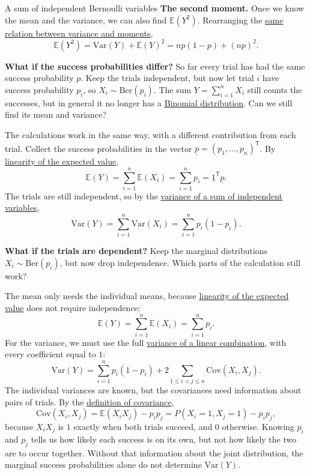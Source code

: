 \documentclass[a4paper,12pt,oneside]{report}
\begin{document}
\begin{framedexample}{A sum of independent Bernoulli variables}
\textbf{The second moment.} Once we know the mean and the variance, we
can also find $\mathbb{E}(Y^2)$. Rearranging the
\hyperref[prop:var-moments]{same relation between variance and moments},
\[
\mathbb{E}(Y^2)=\mathrm{Var}(Y)+\mathbb{E}(Y)^2
=np(1-p)+(np)^2.
\]

\textbf{What if the success probabilities differ?} So far every trial
has had the same success probability $p$. Keep the trials independent,
but now let trial $i$ have success probability $p_i$, so
$X_i\sim\mathrm{Ber}(p_i)$. The sum $Y=\sum_{i=1}^nX_i$ still counts
the successes, but in general it no longer has a
\hyperref[sec:binomial]{Binomial distribution}. Can we still find its
mean and variance?

The calculations work in the same way, with a different contribution
from each trial. Collect the success probabilities in the vector
$\underline{p}=(p_1,\ldots,p_n)^{\mathsf T}$. By
\hyperref[prop:linear-vector]{linearity of the expected value},
\[
\mathbb{E}(Y)=\sum_{i=1}^n\mathbb{E}(X_i)
=\sum_{i=1}^n p_i=\underline{1}^{\mathsf T}\underline{p}.
\]
The trials are still independent, so by
the \hyperref[cor:var-independent]{variance of a sum of independent variables},
\[
\mathrm{Var}(Y)=\sum_{i=1}^n\mathrm{Var}(X_i)
=\sum_{i=1}^n p_i(1-p_i).
\]

\textbf{What if the trials are dependent?} Keep the marginal
distributions $X_i\sim\mathrm{Ber}(p_i)$, but now drop independence.
Which parts of the calculation still work?

The mean only needs the individual means, because
\hyperref[prop:linear-vector]{linearity of the expected value} does not
require independence:
\[
\mathbb{E}(Y)=\sum_{i=1}^n\mathbb{E}(X_i)
=\sum_{i=1}^n p_i.
\]
For the variance, we must use the full
\hyperref[prop:var-linear]{variance of a linear combination}, with
every coefficient equal to $1$:
\[
\mathrm{Var}(Y)=\sum_{i=1}^n p_i(1-p_i)
+2\sum_{1\le i<j\le n}\mathrm{Cov}(X_i,X_j).
\]
The individual variances are known, but the covariances need information
about pairs of trials. By the
\hyperref[def:covariance]{definition of covariance},
\[
\mathrm{Cov}(X_i,X_j)=\mathbb{E}(X_iX_j)-p_i p_j
=P(X_i=1,X_j=1)-p_i p_j,
\]
because $X_iX_j$ is $1$ exactly when both trials succeed, and $0$
otherwise. Knowing $p_i$ and $p_j$ tells us how likely each success is
on its own, but not how likely the two are to occur together. Without
that information about the joint distribution, the marginal success
probabilities alone do not determine $\mathrm{Var}(Y)$.
\end{framedexample}
\end{document}
